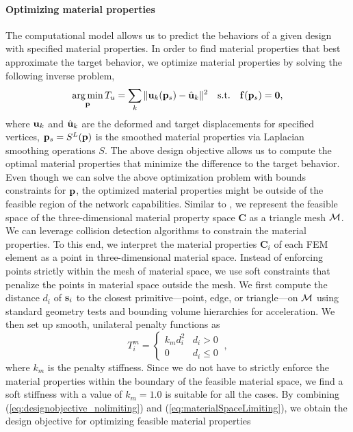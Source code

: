 \paragraph{Optimizing material properties} The computational model allows us to predict the behaviors of a given design with specified material properties. In order to find material properties that best approximate the target behavior, we optimize material properties by solving the following inverse problem,
\begin{equation}
    \operatorname*{arg\,min}_{\mathbf{p}} T_u = \sum_k\|\mathbf{u}_k(\mathbf{p}_s) - \hat{\mathbf{u}}_k\|^2 \quad\text{s.t.}\quad  \mathbf{f}(\mathbf{p}_s) = \mathbf{0},
    \label{eq:designobjective_nolimiting}
\end{equation}
where $\mathbf{u}_k$ and $\hat{\mathbf{u}}_k$ are the deformed and target displacements for specified vertices, $\mathbf{p}_s = S^L(\mathbf{p})$ is the smoothed material properties via Laplacian smoothing operations $S$. 
The above design objective allows us to compute the optimal material properties that minimize the difference to the target behavior. 
Even though we can solve the above optimization problem with bounds constraints for $\mathbf{p}$, the optimized material properties might be outside of the feasible region of the network capabilities. Similar to \cite{tang2023beyond}, we represent the feasible space of the three-dimensional material property space $\mathbf{C}$ as a triangle mesh $\mathcal{M}$.  We can leverage collision detection algorithms to constrain the material properties. To this end, we interpret the material properties $\mathbf{C}_i$ of each FEM element as a point in three-dimensional material space. Instead of enforcing points strictly within the mesh of material space, we use soft constraints that penalize the points in material space outside the mesh. We first compute the distance $d_i$ of $\mathbf{s}_i$ to the closest primitive---point, edge, or triangle---on $\mathcal{M}$ using standard geometry tests and bounding volume hierarchies for acceleration. We then set up smooth, unilateral penalty functions as
\begin{equation}
    T^m_i = \begin{cases}
    k_m d_i^2 & d_i > 0 \\
    0 & d_i\leq 0
    \end{cases} \ ,
    \label{eq:materialSpaceLimiting}
\end{equation}
where $k_m$ is the penalty stiffness. Since we do not have to strictly enforce the material properties within the boundary of the feasible material space, we find a soft stiffness with a value of $k_m=1.0$ is suitable for all the cases. By combining (\ref{eq:designobjective_nolimiting}) and (\ref{eq:materialSpaceLimiting}), we obtain the design objective for optimizing feasible material properties
